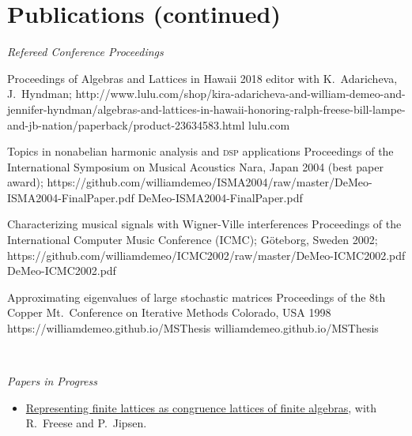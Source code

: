 \newpage
    \section{\mysidestyle Publications (continued)}

\noindent    \textit{Refereed Conference Proceedings}

\begin{enumerate}
  \setcounter{enumi}{5}
  \pub
  {Proceedings of Algebras and Lattices in Hawaii 2018}
  {editor with K.~Adaricheva, J.~Hyndman;}
  {}
  {}
  {http://www.lulu.com/shop/kira-adaricheva-and-william-demeo-and-jennifer-hyndman/algebras-and-lattices-in-hawaii-honoring-ralph-freese-bill-lampe-and-jb-nation/paperback/product-23634583.html}
  {lulu.com}

  \pub
  {Topics in nonabelian harmonic analysis and \textsc{dsp}  applications}
  {}
  {Proceedings of the International Symposium on Musical Acoustics}
  {Nara, Japan 2004 (best paper award);}
  {https://github.com/williamdemeo/ISMA2004/raw/master/DeMeo-ISMA2004-FinalPaper.pdf}
  {DeMeo-ISMA2004-FinalPaper.pdf}

  \pub
  {Characterizing musical signals with Wigner-Ville interferences}
  {}
  {Proceedings of the International Computer Music Conference {\small (ICMC)};}
  {G\"{o}teborg, Sweden 2002;}
  {https://github.com/williamdemeo/ICMC2002/raw/master/DeMeo-ICMC2002.pdf}
  {DeMeo-ICMC2002.pdf}

  \pub
  {Approximating eigenvalues of large stochastic matrices}
  {}
  {Proceedings of the 8th Copper Mt.~Conference on Iterative Methods}
  {Colorado, USA 1998}
  {https://williamdemeo.github.io/MSThesis}
  {williamdemeo.github.io/MSThesis}

\end{enumerate}

~\vspace{-14mm}

{\it Papers in Progress}\\[-8pt]
\begin{itemize}
  \item[] \href{https://github.com/UniversalAlgebra/fin-lat-rep}{Representing finite lattices as congruence lattices of finite algebras}, with R.~Freese and P.~Jipsen.
\end{itemize}

